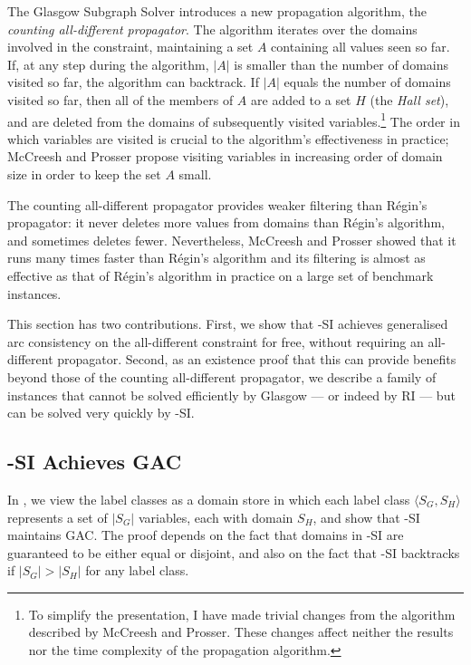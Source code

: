 The Glasgow Subgraph Solver \citep{DBLP:conf/cp/McCreeshP15} introduces a new propagation algorithm,
the \emph{counting all-different propagator}.
The algorithm iterates over the domains involved in the constraint, maintaining a set $A$ containing
all values seen so far.  If, at any step during the algorithm, $|A|$ is smaller than the number
of domains visited so far, the algorithm can backtrack.  If $|A|$ equals the number of domains visited
so far, then all of the members of $A$ are added to a set $H$ (the \emph{Hall set}), and are deleted from
the domains of subsequently visited variables.\footnote{To simplify the presentation,
I have made trivial changes from the algorithm described by McCreesh and Prosser.
These changes affect neither the results nor the time complexity of the propagation algorithm.}
The order in which variables are visited is crucial
to the algorithm's effectiveness in practice; McCreesh and Prosser
propose visiting variables in increasing order of domain size in order to keep the set $A$ small.

The counting all-different propagator provides weaker filtering than
R\'egin's propagator: it never deletes more values from domains than R\'egin's algorithm, and sometimes
deletes fewer. Nevertheless, McCreesh and Prosser showed that it runs many times faster than
R\'egin's algorithm and its filtering is almost as effective as that of R\'egin's algorithm in practice
on a large set of benchmark instances.

This section has two contributions. First, we show that \McSplit-SI achieves generalised arc consistency
on the all-different constraint for free, without requiring an all-different propagator.
Second, as an existence proof that this can provide benefits beyond those of the counting all-different
propagator, we describe
a family of instances that cannot be solved efficiently by Glasgow --- or indeed by RI --- but can
be solved very quickly by \McSplit-SI.

\subsection{\McSplit-SI Achieves GAC}

In , we view the label classes as a domain store in which each label
class $\langle S_G, S_H \rangle$ represents a set of $|S_G|$ variables, each with domain $S_H$,
and show that \McSplit-SI maintains GAC.  The proof depends on the fact that domains in
\McSplit-SI are guaranteed to be
either equal or disjoint, and also on the fact that \McSplit-SI backtracks if $|S_G| > |S_H|$
for any label class.

